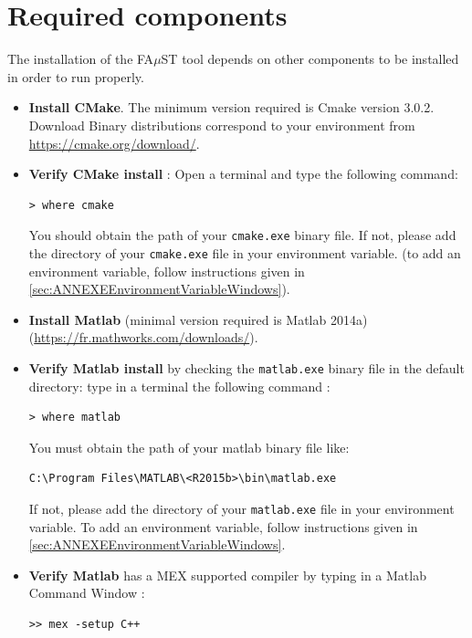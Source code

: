 \section{Required components}\label{sec:WinRequired}
The installation of the FA$\mu$ST tool depends on other components to be installed in order to run properly. 

\begin{itemize}
\item \textbf{Install CMake}. The minimum version required is Cmake version 3.0.2. Download Binary distributions correspond to your environment from \url{https://cmake.org/download/}.
\item \textbf{Verify CMake install} : Open a terminal and type the following command:
\lstset{style=customBash}
\begin{lstlisting}
> where cmake
\end{lstlisting}
You should obtain the path of your \texttt{cmake.exe} binary file. If not, please add the directory of your \texttt{cmake.exe} file in your environment variable. (to add an environment variable, follow instructions given in \ref{sec:ANNEXEEnvironmentVariableWindows}). 

\item \textbf{Install Matlab} (minimal version required is Matlab 2014a) (\url{https://fr.mathworks.com/downloads/}). 

\item \textbf{Verify Matlab install} by checking the \texttt{matlab.exe} binary file in the default directory:  type in a terminal the following command : 
\lstset{style=customBash}
\begin{lstlisting}
> where matlab
\end{lstlisting}
You must obtain the path of your matlab binary file like: 
\begin{lstlisting}
C:\Program Files\MATLAB\<R2015b>\bin\matlab.exe
\end{lstlisting}
If not, please add the directory of your \texttt{matlab.exe} file in your environment variable. To add an environment variable, follow instructions given in \ref{sec:ANNEXEEnvironmentVariableWindows}. \\

\item \textbf{Verify Matlab} has a MEX supported compiler by typing in a Matlab Command Window :
\lstset{style=customMatlab}
\begin{lstlisting}
>> mex -setup C++
\end{lstlisting}


\end{itemize}
